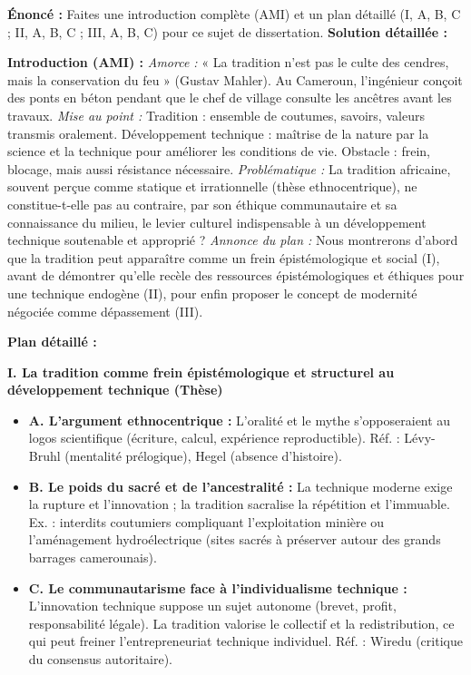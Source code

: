 \documentclass[11pt]{article}
\newcommand{\cle}[1]{{\popxbold\color{popdark}#1}}
\begin{document}
\begin{exoresolu}
\textbf{Énoncé :} Faites une introduction complète (AMI) et un plan détaillé (I, A, B, C ; II, A, B, C ; III, A, B, C) pour ce sujet de dissertation.
\tcblower
\textbf{Solution détaillée :}

\textbf{Introduction (AMI) :}
\emph{Amorce :} « La tradition n'est pas le culte des cendres, mais la conservation du feu » (Gustav Mahler). Au Cameroun, l'ingénieur conçoit des ponts en béton pendant que le chef de village consulte les ancêtres avant les travaux.
\emph{Mise au point :} \cle{Tradition} : ensemble de coutumes, savoirs, valeurs transmis oralement. \cle{Développement technique} : maîtrise de la nature par la science et la technique pour améliorer les conditions de vie. \cle{Obstacle} : frein, blocage, mais aussi résistance nécessaire.
\emph{Problématique :} La tradition africaine, souvent perçue comme statique et irrationnelle (thèse ethnocentrique), ne constitue-t-elle pas au contraire, par son éthique communautaire et sa connaissance du milieu, le \cle{levier culturel} indispensable à un développement technique \cle{soutenable} et \cle{approprié} ?
\emph{Annonce du plan :} Nous montrerons d'abord que la tradition peut apparaître comme un frein épistémologique et social (I), avant de démontrer qu'elle recèle des ressources épistémologiques et éthiques pour une technique endogène (II), pour enfin proposer le concept de \cle{modernité négociée} comme dépassement (III).

\textbf{Plan détaillé :}

\textbf{I. La tradition comme frein épistémologique et structurel au développement technique (Thèse)}
\begin{itemize}
    \item \textbf{A. L'argument ethnocentrique :} L'oralité et le mythe s'opposeraient au \cle{logos} scientifique (écriture, calcul, expérience reproductible). Réf. : Lévy-Bruhl (mentalité prélogique), Hegel (absence d'histoire).
    \item \textbf{B. Le poids du sacré et de l'ancestralité :} La technique moderne exige la \cle{rupture} et l'\cle{innovation} ; la tradition sacralise la \cle{répétition} et l'\cle{immuable}. Ex. : interdits coutumiers compliquant l'exploitation minière ou l'aménagement hydroélectrique (sites sacrés à préserver autour des grands barrages camerounais).
    \item \textbf{C. Le communautarisme face à l'individualisme technique :} L'innovation technique suppose un \cle{sujet autonome} (brevet, profit, responsabilité légale). La tradition valorise le \cle{collectif} et la \cle{redistribution}, ce qui peut freiner l'entrepreneuriat technique individuel. Réf. : Wiredu (critique du consensus autoritaire).
\end{itemize}


\end{exoresolu}
\end{document}
